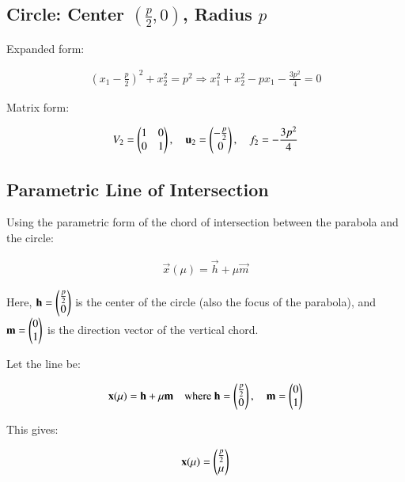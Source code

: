 \documentclass{article}
\begin{document}
\subsection*{Circle: Center $(\frac{p}{2}, 0)$, Radius $p$}

Expanded form:


\begin{align}
(x_1 - \frac{p}{2})^2 + x_2^2 = p^2
\Rightarrow x_1^2 + x_2^2 - p x_1 - \frac{3p^2}{4} = 0
\end{align}



Matrix form:


\begin{align}
V_2 = \begin{pmatrix}1 & 0 \\ 0 & 1\end{pmatrix}, \quad
\mathbf{u}_2 = \begin{pmatrix}-\frac{p}{2} \\ 0\end{pmatrix}, \quad
f_2 = -\frac{3p^2}{4}
\end{align}



\subsection*{Parametric Line of Intersection}







Using the parametric form of the chord of intersection between the parabola and the circle:


\begin{align}
\vec{x}(\mu) = \vec{h} + \mu \vec{m}
\end{align}


Here, $\mathbf{h} = \begin{pmatrix}\frac{p}{2} \\ 0\end{pmatrix}$ is the center of the circle (also the focus of the parabola), and $\mathbf{m} = \begin{pmatrix}0 \\ 1\end{pmatrix}$ is the direction vector of the vertical chord.

Let the line be:


\begin{align}
\mathbf{x}(\mu) = \mathbf{h} + \mu \mathbf{m}
\quad \text{where } \mathbf{h} = \begin{pmatrix}\frac{p}{2} \\ 0\end{pmatrix}, \quad
\mathbf{m} = \begin{pmatrix}0 \\ 1\end{pmatrix}
\end{align}

This gives:

\begin{align}
\mathbf{x}(\mu) = \begin{pmatrix}\frac{p}{2} \\ \mu\end{pmatrix}
\end{align}
\end{document}

